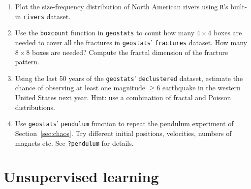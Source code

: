 \begin{enumerate}
  
\item Plot the size-frequency distribution of North American rivers
  using \texttt{R}'s built-in \texttt{rivers} dataset.

\item Use the \texttt{boxcount} function in \texttt{geostats} to count
  how many $4\times{4}$ boxes are needed to cover all the fractures in
  \texttt{geostats}' \texttt{fractures} dataset. How many $8\times{8}$
  boxes are needed? Compute the fractal dimension of the fracture
  pattern.
  
\item Using the last 50 years of the \texttt{geostats}'
  \texttt{declustered} dataset, estimate the chance of observing at
  least one magnitude $\geq$6 earthquake in the western United States
  next year. Hint: use a combination of fractal and Poisson
  distributions.

\item Use \texttt{geostats}' \texttt{pendulum} function to repeat the
  pendulum experiment of Section~\ref{sec:chaos}. Try different
  initial positions, velocities, numbers of magnets etc. See
  \texttt{?pendulum} for details.
  
\end{enumerate}

\section{Unsupervised learning}
\label{sec:ex-unsupervised}

